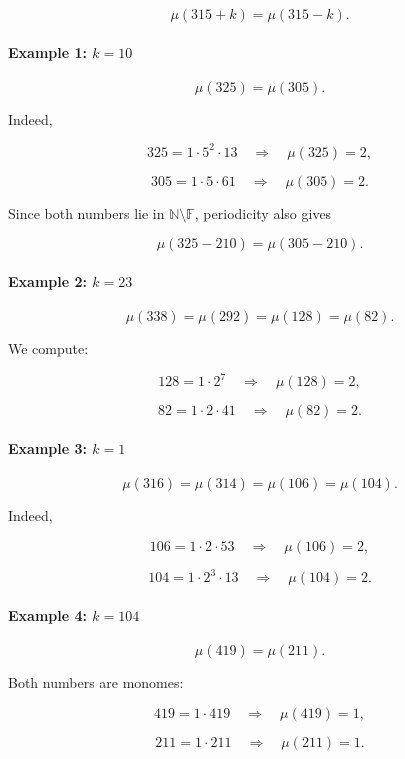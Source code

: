 \documentclass{article}
\begin{document}
\[
\mu(315 + k) = \mu(315 - k).
\]

\paragraph{Example 1: $k = 10$}

\[
\mu(325) = \mu(305).
\]

Indeed,

\[
325 = 1 \cdot 5^2 \cdot 13 \quad \Rightarrow \quad \mu(325) = 2,
\]

\[
305 = 1 \cdot 5 \cdot 61 \quad \Rightarrow \quad \mu(305) = 2.
\]

Since both numbers lie in $\mathbb{N}\setminus \mathbb{F}$, periodicity also gives

\[
\mu(325 - 210) = \mu(305 - 210).
\]

\paragraph{Example 2: $k = 23$}

\[
\mu(338) = \mu(292) = \mu(128) = \mu(82).
\]

We compute:

\[
128 = 1 \cdot 2^7 \quad \Rightarrow \quad \mu(128) = 2,
\]

\[
82 = 1 \cdot 2 \cdot 41 \quad \Rightarrow \quad \mu(82) = 2.
\]

\paragraph{Example 3: $k = 1$}

\[
\mu(316) = \mu(314) = \mu(106) = \mu(104).
\]

Indeed,

\[
106 = 1 \cdot 2 \cdot 53 \quad \Rightarrow \quad \mu(106) = 2,
\]

\[
104 = 1 \cdot 2^3 \cdot 13 \quad \Rightarrow \quad \mu(104) = 2.
\]

\paragraph{Example 4: $k = 104$}

\[
\mu(419) = \mu(211).
\]

Both numbers are monomes:

\[
419 = 1 \cdot 419 \quad \Rightarrow \quad \mu(419) = 1,
\]

\[
211 = 1 \cdot 211 \quad \Rightarrow \quad \mu(211) = 1.
\]
\end{document}
